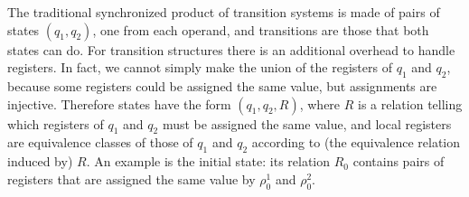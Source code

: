 The traditional synchronized product of transition systems \cite{...} is made of pairs of states $(q_1,q_2)$, one from each operand, and transitions are those that both states can do. For transition structures there is an additional overhead to handle registers. In fact, we cannot simply make the union of the registers of $q_1$ and $q_2$, because some registers could be assigned the same value, but assignments are injective. Therefore states have the form $(q_1,q_2,R)$, where $R$ is a relation telling which registers of $q_1$ and $q_2$ must be assigned the same value, and local registers are equivalence classes of those of $q_1$ and $q_2$ according to (the equivalence relation induced by) $R$. An example is the initial state: its relation $R_0$ contains pairs of registers that are assigned the same value by $\rho_0^1$ and $\rho_0^2$. 


% 

